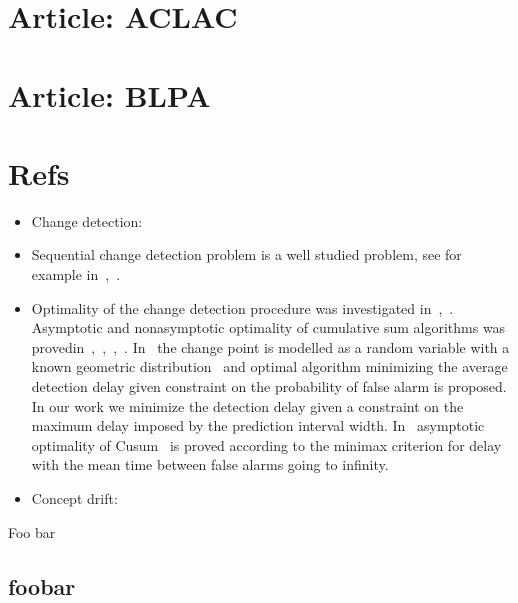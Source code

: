 \documentclass[doctoral,utf8,lot,loar,lof,shortloft,index]{jydiss}
\begin{document}
\chapter{Article: ACLAC}


\chapter{Article: BLPA}



\chapter{Refs}
\begin{itemize}
  \item Change detection:~\cite{basseville1993detection}
  \item Sequential change detection problem is a well studied problem, see for example in~\cite{tartakovsky2014sequential},~\cite{plasse2021streaming}.

  \item Optimality of the change detection procedure was investigated in~\cite{Page1954},~\cite{Shiryaev2010,Shiryaev1961,Shiryaev1963}.
  Asymptotic and nonasymptotic optimality of cumulative sum algorithms was provedin~\cite{lorden1971procedures},~\cite{moustakides1986optimal},~\cite{moustakides2004optimality},~\cite{ritov1990decision}. In~\cite{Shiryaev1963,shiryaev2007optimal} the change point is modelled as a random variable with a known geometric distribution~\cite{veeravalli2014quickest} and optimal algorithm minimizing the average detection delay given constraint on the probability of false alarm is proposed. In our work we minimize the detection delay given a constraint on the maximum delay imposed by the prediction interval width. In~\cite{lorden1971procedures} asymptotic optimality of Cusum~\cite{Page1954} is proved according to the minimax criterion for delay with the mean time between false alarms going to infinity.

  \item Concept drift:
\end{itemize}

\tailmatter
\finnishsummary
Foo bar





\appendices
{}
\section{foobar}

\backmatter


\printindex
\end{document}
